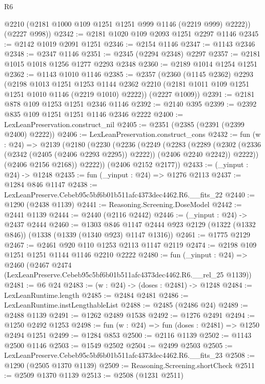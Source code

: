 \begin{lexlean}{R6}
\begin{coremodule}
        @2210
        (@2181 @1000 @109 @1251 @1251 @999 @1146 (@2219 @999) @2222))
      (@2227 @998))
@2342 := @2181 @1020 @109 @2093 @1251 @2297 @1146
@2345 := @2142 @1019 @2091 @1251
@2346 := @2154 @1146
@2347 := @1143 @2346
@2348 := @2347 @1146
@2351 := @2345 (@2294 @2348) @2297
@2357 := @2181 @1015 @1018 @1256 @1277 @2293 @2348
@2360 := @2189 @1014 @1254 @1251
@2362 := @1143 @1010 @1146
@2385 := @2357
    (@2360
      (@1145 @2362)
      @2293
      (@2198
        @1013
        @1251
        @1253
        @1144
        @2362
        @2210
        (@2181 @1011 @109 @1251 @1251 @1010 @1146 (@2219 @1010) @2222))
      (@2227 @1009))
@2391 := @2181 @878 @109 @1253 @1251 @2346 @1146
@2392 := @2140 @395
@2399 := @2392 @835 @109 @1251 @1251 @1146 @2346 @2222
@2400 := LexLeanPreservation.construct_nil
@2405 := @2351 (@2385 (@2391 (@2399 @2400) @2222))
@2406 := LexLeanPreservation.construct_cons
@2432 := fun (w : @24) =>
  @2139
    (@2180
      (@2230
        (@2236
          (@2249
            (@2283
              (@2289
                (@2302 (@2336 (@2342 (@2405 (@2406 @2293 @2295)) @2222)) (@2406 @2240 @2242))
                @2222))
            (@2406 @2156 @2168))
          @2222))
      (@2406 @2152 @2177))
@2433 := (_yinput : @24) -> @1248
@2435 := fun (_yinput : @24) => @1276 @2113
@2437 := @1284 @846 @1147
@2438 := LexLeanPreserve.Cebeb95c5bf6b01b511afc4373dec4462.R6.__fits_22
@2440 := @1290 (@2438 @1139)
@2441 := Reasoning.Screening.DoseModel
@2442 := @2441 @1139
@2444 := @2440 (@2116 @2442)
@2446 := (_yinput : @24) -> @2437 @2444
@2460 := @1303
    @846
    @1147
    @2444
    @923
    @2129
    (@1322 (@1332 @846))
    (@1338 (@1339 (@1340 @923) @1147 @1316))
@2461 := @1775 @2129
@2467 := @2461 @920 @110 @1253 @2113 @1147 @2119
@2474 := @2198 @109 @1251 @1251 @1144 @1146 @2210 @2222
@2480 := fun (_yinput : @24) =>
  @2460 (@2467 @2474 (LexLeanPreserve.Cebeb95c5bf6b01b511afc4373dec4462.R6.__rel_25 @1139))
@2481 := @6 @24
@2483 := (w : @24) -> (doses : @2481) -> @1248
@2484 := LexLeanRuntime.length
@2485 := @2484 @2481
@2486 := LexLeanRuntime.instLengthableList
@2488 := @2485 (@2486 @24)
@2489 := @2488 @1139
@2491 := @1262 @2489 @1538
@2492 := @1276 @2491
@2494 := @1250 @2492 @1253
@2498 := fun (w : @24) => fun (doses : @2481) => @1250 @2494 @1251
@2499 := @1284 @853
@2500 := @2116 @1139
@2502 := @1143 @2500 @1146
@2503 := @1549 @2502
@2504 := @2499 @2503
@2505 := LexLeanPreserve.Cebeb95c5bf6b01b511afc4373dec4462.R6.__fits_23
@2508 := @1290 (@2505 @1370 @1139)
@2509 := Reasoning.Screening.shortCheck
@2511 := @2509 @1370 @1139
@2513 := @2508 (@1231 @2511)

\end{coremodule}
\end{lexlean}
